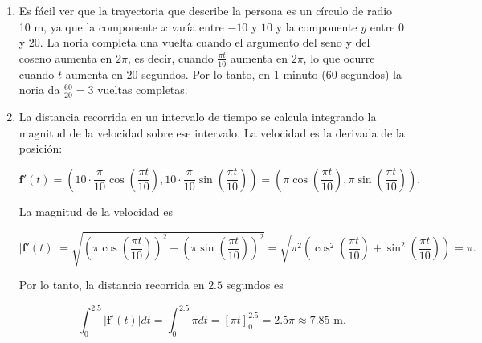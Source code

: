 \documentclass[
  spanish,
  a4paper,
]{scrreport}
\theoremstyle{definition}
\theoremstyle{remark}
\begin{document}
\begin{tcolorbox}[enhanced jigsaw, arc=.35mm, bottomrule=.15mm, bottomtitle=1mm, breakable, colback=white, colbacktitle=quarto-callout-tip-color!10!white, colframe=quarto-callout-tip-color-frame, coltitle=black, left=2mm, leftrule=.75mm, opacityback=0, opacitybacktitle=0.6, rightrule=.15mm, title=\textcolor{quarto-callout-tip-color}{\faLightbulb}\hspace{0.5em}{Solución}, titlerule=0mm, toprule=.15mm, toptitle=1mm]

\begin{enumerate}
\def\labelenumi{\alph{enumi}.}
\item
  Es fácil ver que la trayectoria que describe la persona es un círculo
  de radio 10 m, ya que la componente \(x\) varía entre \(-10\) y \(10\)
  y la componente \(y\) entre \(0\) y \(20\). La noria completa una
  vuelta cuando el argumento del seno y del coseno aumenta en \(2\pi\),
  es decir, cuando \(\frac{\pi t}{10}\) aumenta en \(2\pi\), lo que
  ocurre cuando \(t\) aumenta en \(20\) segundos. Por lo tanto, en 1
  minuto (60 segundos) la noria da \(\frac{60}{20} = 3\) vueltas
  completas.
\item
  La distancia recorrida en un intervalo de tiempo se calcula integrando
  la magnitud de la velocidad sobre ese intervalo. La velocidad es la
  derivada de la posición:

  \[
  \mathbf{f}'(t) = \left(10 \cdot \frac{\pi}{10} \cos\left(\frac{\pi t}{10}\right), 10 \cdot \frac{\pi}{10} \sin\left(\frac{\pi t}{10}\right)\right) = (\pi \cos\left(\frac{\pi t}{10}\right), \pi \sin\left(\frac{\pi t}{10}\right)).
  \]

  La magnitud de la velocidad es

  \[
  |\mathbf{f}'(t)| = \sqrt{(\pi \cos\left(\frac{\pi t}{10}\right))^2 + (\pi \sin\left(\frac{\pi t}{10}\right))^2} = \sqrt{\pi^2 (\cos^2\left(\frac{\pi t}{10}\right) + \sin^2\left(\frac{\pi t}{10}\right))} = \pi.
  \]

  Por lo tanto, la distancia recorrida en \(2.5\) segundos es

  \[
  \int_0^{2.5} |\mathbf{f}'(t)| dt = \int_0^{2.5} \pi dt = \left[\pi t \right]_0^{2.5} = 2.5\pi \approx 7.85 \text{ m}.
  \]


\end{enumerate}
\end{tcolorbox}
\end{document}
